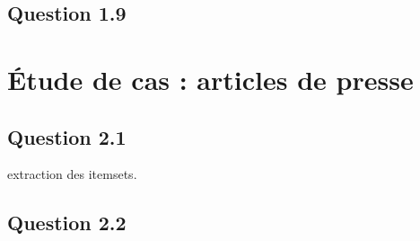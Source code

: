 \documentclass[a4paper,12pt]{article}
\begin{document}
\subsection*{Question 1.9}




\section{\'Etude de cas : articles de presse}

\subsection*{Question 2.1}

extraction des itemsets.


\subsection*{Question 2.2}
\end{document}
